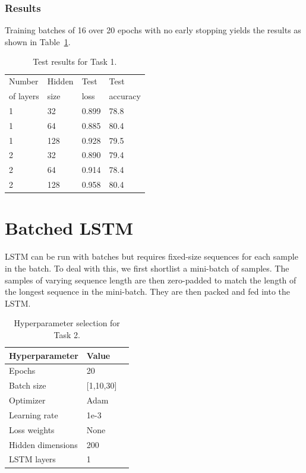 \documentclass[twocolumn, 9pt]{article}
\begin{document}
\subsubsection*{Results}
Training batches of 16 over 20 epochs with no early stopping yields the
results as shown in Table~\ref{tab:res1}.
\begin{table}[h]
  \centering
  \begin{tabular}{llll}
    \toprule
    Number & Hidden & Test & Test \\
    of layers & size & loss & accuracy \\
    \midrule
    1 & 32  & 0.899 & 78.8 \\
    1 & 64  & 0.885 & 80.4 \\
    1 & 128 & 0.928 & 79.5 \\
    2 & 32  & 0.890 & 79.4 \\
    2 & 64  & 0.914 & 78.4 \\
    2 & 128 & 0.958 & 80.4 \\
    \bottomrule
  \end{tabular}
  \caption{Test results for Task 1.}
  \label{tab:res1}
\end{table}

\section{Batched LSTM}
LSTM can be run with batches but requires fixed-size sequences for each
sample in the batch. To deal with this, we first shortlist a mini-batch
of samples. The samples of varying sequence length are then zero-padded
to match the length of the longest sequence in the mini-batch. They are
then packed and fed into the LSTM.

\begin{table}[h]
  \centering
  \begin{tabular}{lll}
    \toprule
    Hyperparameter    & Value  \\
    \midrule
    Epochs            & 20     \\
    Batch size        & [1,10,30]\\
    Optimizer         & Adam   \\
    Learning rate     & 1e-3   \\
    Loss weights      & None   \\
    Hidden dimensions & 200    \\
    LSTM layers       & 1      \\
    \bottomrule
  \end{tabular}
  \caption{Hyperparameter selection for Task 2.}
  \label{tab:hyp2}
\end{table}
\end{document}
